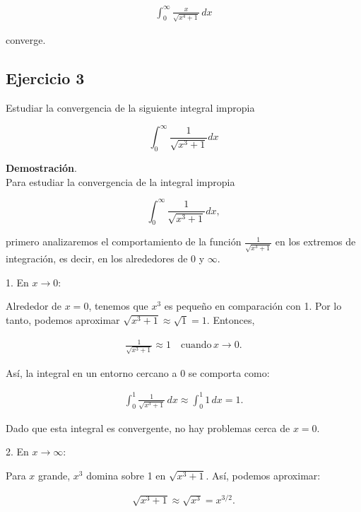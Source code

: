 \documentclass{article}
\begin{document}
    \begin{align*}
    \int_{0}^{\infty} \frac{x}{\sqrt{x^{4}+1}} \, dx
    \end{align*}

    converge.



    \subsection*{Ejercicio 3}

    Estudiar la convergencia de la siguiente integral impropia

    $$
    \int_{0}^{\infty} \frac{1}{\sqrt{x^{3}+1}} d x
    $$

    \textbf{Demostración}.\\

    Para estudiar la convergencia de la integral impropia

    $$
    \int_{0}^{\infty} \frac{1}{\sqrt{x^{3}+1}} d x,
    $$

    primero analizaremos el comportamiento de la función \( \frac{1}{\sqrt{x^3 + 1}} \) en los extremos de integración, es decir, en los alrededores de 0 y \(\infty\).

    1. En \( x \to 0 \):

    Alrededor de \( x = 0 \), tenemos que \( x^3 \) es pequeño en comparación con 1. Por lo tanto, podemos aproximar \( \sqrt{x^3 + 1} \approx \sqrt{1} = 1 \). Entonces,

    \begin{align*}
    \frac{1}{\sqrt{x^3 + 1}} \approx 1 \quad \text{cuando} \, x \to 0.
    \end{align*}

    Así, la integral en un entorno cercano a 0 se comporta como:

    \begin{align*}
    \int_{0}^{1} \frac{1}{\sqrt{x^3 + 1}} \, dx \approx \int_{0}^{1} 1 \, dx = 1.
    \end{align*}

    Dado que esta integral es convergente, no hay problemas cerca de \( x = 0 \).

    2. En \( x \to \infty \):

    Para \( x \) grande, \( x^3 \) domina sobre 1 en \( \sqrt{x^3 + 1} \). Así, podemos aproximar:

    \begin{align*}
    \sqrt{x^3 + 1} \approx \sqrt{x^3} = x^{3/2}.
    \end{align*}
\end{document}
